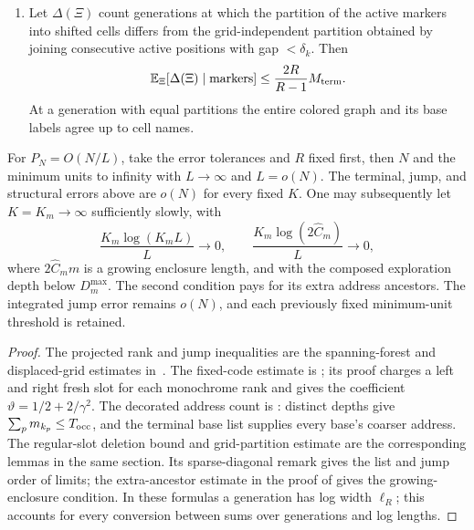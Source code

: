 \begin{proposition}
\begin{enumerate}[label=(\roman*)]
\begin{equation}
 (\ell_R+C_0+\eta)t
 +K P_N\log(K/\eta)+C P_NK\log(K+1)+O(1).
\end{equation}
If the depth list itself is encoded, add
\(\log\binom{J_R+1}{P_N}\); our independent mesh phases are
instead held as side information.
\item Let \(\Delta(\Xi)\) count generations at which the partition
of the active markers into shifted cells differs from the
grid-independent partition obtained by joining consecutive active
positions with gap \(<\delta_k\).  Then
\[
 \mathbb E_\Xi[\Delta(\Xi)\mid\text{markers}]
 \le \frac{2R}{R-1}M_{\rm term}.
\]
At a generation with equal partitions the entire colored graph
and its base labels agree up to cell names.
\end{enumerate}
For \(P_N=O(N/L)\), take the error tolerances and \(R\) fixed first,
then \(N\) and the minimum units to infinity with \(L\to\infty\)
and \(L=o(N)\).  The terminal, jump, and structural errors above
are \(o(N)\) for every fixed \(K\).  One may subsequently let
\(K=K_m\to\infty\) sufficiently slowly, with
\[
 \frac{K_m\log(K_mL)}{L}\longrightarrow0,\qquad
 \frac{K_m\log(2\widehat C_m)}{L}\longrightarrow0,
\]
where \(2\widehat C_m m\) is a growing enclosure length, and with
the composed exploration depth below \(D_m^{\max}\).
The second condition pays for its extra address ancestors.  The
integrated jump error remains \(o(N)\), and each previously fixed
minimum-unit threshold is retained.
\end{proposition}

\begin{proof}
The projected rank and jump inequalities are the spanning-forest
and displaced-grid estimates in~\cite[Section~10]{P}.
The fixed-code estimate is \cite[Proposition~10.15]{P}; its proof
charges a left and right fresh slot for each monochrome rank and
gives the coefficient \(\vartheta=1/2+2/\gamma^2\).
The decorated address count is \cite[Lemma~10.13]{P}: distinct
depths give \(\sum_p m_{k_p}\le T_{\rm occ}\), and the terminal
base list supplies every base's coarser address.  The regular-slot
deletion bound and grid-partition estimate are the corresponding
lemmas in the same section.  Its sparse-diagonal remark gives the
list and jump order of limits; the extra-ancestor estimate in the
proof of \cite[Lemma~11.6]{P} gives the growing-enclosure condition.
In these formulas a generation has log width
\(\ell_R\); this accounts for every conversion between sums over
generations and log lengths.
\end{proof}

